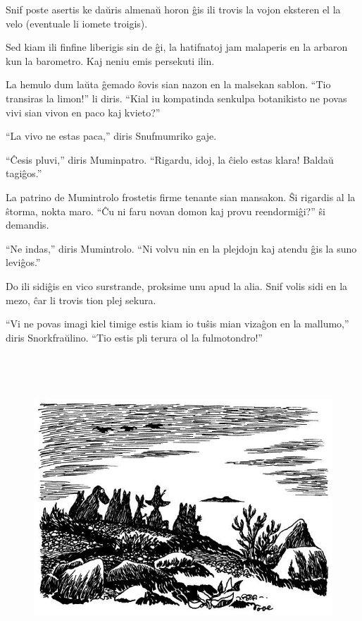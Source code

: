 Snif poste asertis ke daŭris almenaŭ horon ĝis ili trovis la vojon eksteren el la velo (eventuale li iomete troigis).

Sed kiam ili finfine liberigis sin de ĝi, la hatifnatoj jam malaperis en la arbaron kun la barometro. Kaj neniu emis persekuti ilin.

La hemulo dum laŭta ĝemado ŝovis sian nazon en la malsekan sablon. ``Tio transiras la limon!'' li diris. ``Kial iu kompatinda senkulpa botanikisto ne povas vivi sian vivon en paco kaj kvieto?''

``La vivo ne estas paca,'' diris Snufmumriko gaje.

``Ĉesis pluvi,'' diris Muminpatro. ``Rigardu, idoj, la ĉielo estas klara! Baldaŭ tagiĝos.''

La patrino de Mumintrolo frostetis firme tenante sian mansakon. Ŝi rigardis al la ŝtorma, nokta maro. ``Ĉu ni faru novan domon kaj provu reendormiĝi?'' ŝi demandis.

``Ne indas,'' diris Mumintrolo. ``Ni volvu nin en la plejdojn kaj atendu ĝis la suno leviĝos.''

Do ili sidiĝis en vico surstrande, proksime unu apud la alia. Snif volis sidi en la mezo, ĉar li trovis tion plej sekura.

``Vi ne povas imagi kiel timige estis kiam io tuŝis mian vizaĝon en la mallumo,'' diris Snorkfraŭlino. ``Tio estis pli terura ol la fulmotondro!''

\begin{figure}[htbp]
\centering
\includegraphics[width=449pt,height=325pt]{_17.jpg}
\caption{}
\label{_17}
\end{figure}

